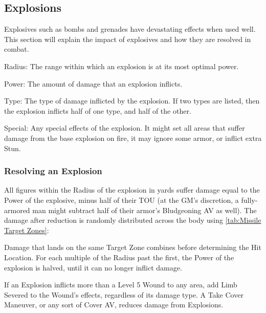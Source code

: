 \documentclass[oneside,11pt,english]{book}
\begin{document}
\subsection{Explosions}\label{sec:Explosions}
Explosives such as bombs and grenades have devastating effects when used well. This section will explain the impact of explosives and how they are resolved in combat.
\begin{description}
\item Radius: The range within which an explosion is at its most optimal power.
\item Power: The amount of damage that an explosion inflicts.
\item Type: The type of damage inflicted by the explosion. If two types are listed, then the explosion inflicts half of one type, and half of the other.
\item Special: Any special effects of the explosion. It might set all areas that suffer damage from the base explosion on fire, it may ignore some armor, or inflict extra Stun.
\end{description}

\subsubsection{Resolving an Explosion}
All figures within the Radius of the explosion in yards suffer damage equal to the Power of the explosive, minus half of their TOU (at the GM's discretion, a fully-armored man might subtract half of their armor's Bludgeoning AV as well). The damage after reduction is randomly distributed across the body using \autoref{tab:Missile Target Zones}:~ 

Damage that lands on the same Target Zone combines before determining the Hit Location.
For each multiple of the Radius past the first, the Power of the explosion is halved, until it can no longer inflict damage. 

If an Explosion inflicts more than a Level 5 Wound to any area, add Limb Severed to the Wound's effects, regardless of its damage type.
A Take Cover Maneuver, or any sort of Cover AV, reduces damage from Explosions.
\end{document}

